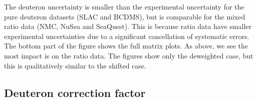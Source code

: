 The deuteron uncertainty is smaller than the experimental uncertainty for the  pure deuteron datasets (SLAC and BCDMS), but is comparable for the mixed ratio data (NMC, NuSea and SeaQuest). This is because ratio data have smaller experimental uncertainties due to a significant cancellation of systematic errors. The bottom part of the figure shows the full matrix plots. As above, we see the most impact is on the ratio data. The figures show only the deweighted case, but this is qualitatively similar to the shifted case. 

\subsection{Deuteron correction factor}

